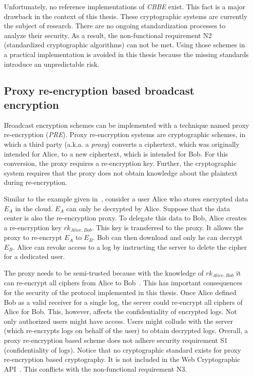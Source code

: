 \documentclass[../main.tex]{subfiles}
\begin{document}
Unfortunately, no reference implementations of \textit{CBBE} exist. 
This fact is a major drawback in the context of this thesis.
These cryptographic systems are currently the subject of research.
There are no ongoing standardization processes to analyze their security.
As a result, the non-functional requirement N2 (standardized cryptographic algorithms) can not be met.
Using those schemes in a practical implementation is avoided in this thesis because the missing standards introduce an unpredictable risk.

\subsection{Proxy re-encryption based broadcast encryption}
\label{sec:broadcast-proxy}
Broadcast encryption schemes can be implemented with a technique named proxy re-encryption (\textit{PRE}).
Proxy re-encryption systems are cryptographic schemes, in which a third party (a.k.a. a \textit{proxy}) converts a ciphertext, which was originally intended for Alice, to a new ciphertext, which is intended for Bob. 
For this conversion, the proxy requires a re-encryption key. 
Further, the cryptographic system requires that the proxy does not obtain knowledge about the plaintext during re-encryption.~\cite{Chen2018}

Similar to the example given in~\cite{Chen2018}, consider a user Alice who stores encrypted data $E_A$ in the cloud.
$E_A$ can only be decrypted by Alice.
Suppose that the data center is also the re-encryption proxy.
To delegate this data to Bob, Alice creates a re-encryption key $rk_{Alice,Bob}$. 
This key is transferred to the proxy.
It allows the proxy to re-encrypt $E_A$ to $E_B$.
Bob can then download and only he can decrypt $E_B$.
Alice can revoke access to a log by instructing the server to delete the cipher for a dedicated user.

The proxy needs to be semi-trusted because with the knowledge of $rk_{Alice,Bob}$ it can re-encrypt all ciphers from Alice to Bob~\cite{Chen2018}.
This has important consequences for the security of the protocol implemented in this thesis.
Once Alice defined Bob as a valid receiver for a single log, the server could re-encrypt all ciphers of Alice for Bob.
This, however, affects the confidentiality of encrypted logs.
Not only authorized users might have access.
Users might collude with the server (which re-encrypts logs on behalf of the user) to obtain decrypted logs.
Overall, a proxy re-encryption based scheme does not adhere security requirement S1 (confidentiality of logs).
Notice that no cryptographic standard exists for proxy re-encryption based cryptography.
It is not included in the Web Cryptographic API~\cite{WebCryptoApi2017}.
This conflicts with the non-functional requirement N3.
\end{document}
